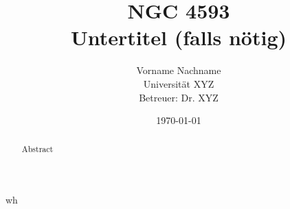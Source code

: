 \documentclass[a4paper,12pt]{report}
\title{\textbf{NGC 4593} \\ \Large Untertitel (falls nötig)}
\author{Vorname Nachname \\ Universität XYZ \\ Betreuer: Dr. XYZ}
\date{\today}
\begin{document}
	
	\maketitle
	\thispagestyle{empty}
	\newpage
	
	\begin{abstract}
		Abstract
	\end{abstract}
	\newpage
	
	\tableofcontents
	\newpage
	
	\listoffigures
	\listoftables
	\newpage
	
	
	
	
	
	
	wh
	
	\printbibliography
	
	\appendix
	
	
\end{document}
